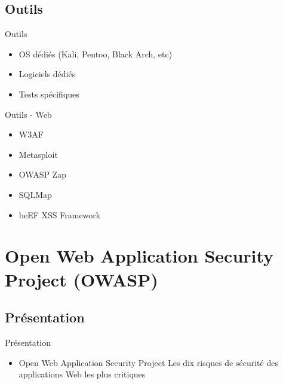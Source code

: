 \documentclass{beamer}
\begin{document}
	\subsection{Outils}
	\begin{frame}{Outils}
		\begin{itemize}
			\item OS dédiés (Kali, Pentoo, Black Arch, etc)
			\item Logiciels dédiés
			\item Tests spécifiques			
		\end{itemize}
	\end{frame}
	\begin{frame}{Outils - Web}
	\begin{itemize}
		\item W3AF
		\item Metasploit
		\item OWASP Zap	
		\item SQLMap
		\item beEF XSS Framework
	\end{itemize}
	\end{frame}

\section{Open Web Application Security Project (OWASP)}
	\subsection{Présentation}
	\begin{frame}{Présentation}
		\begin{itemize}
			\item Open Web Application Security Project
			\itemp Les dix risques de sécurité des applications Web les plus critiques		
		\end{itemize}
	\end{frame}
	
\end{document}
